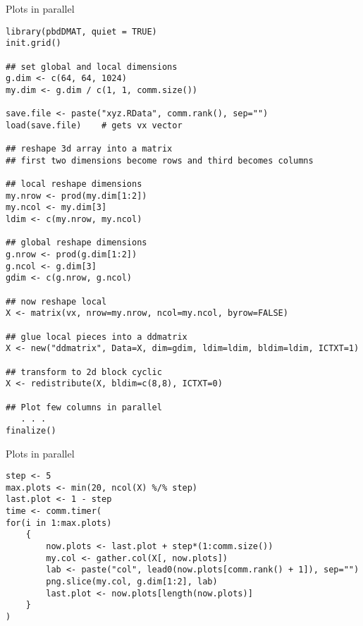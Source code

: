\begin{frame}
  \begin{exampleblock}{Plots in parallel}\pause
\begin{lstlisting}[title=Get and Redistribute the Data]
library(pbdDMAT, quiet = TRUE)
init.grid()

## set global and local dimensions
g.dim <- c(64, 64, 1024)
my.dim <- g.dim / c(1, 1, comm.size())

save.file <- paste("xyz.RData", comm.rank(), sep="")
load(save.file)    # gets vx vector

## reshape 3d array into a matrix
## first two dimensions become rows and third becomes columns

## local reshape dimensions
my.nrow <- prod(my.dim[1:2])
my.ncol <- my.dim[3]
ldim <- c(my.nrow, my.ncol)

## global reshape dimensions
g.nrow <- prod(g.dim[1:2])
g.ncol <- g.dim[3]
gdim <- c(g.nrow, g.ncol)

## now reshape local
X <- matrix(vx, nrow=my.nrow, ncol=my.ncol, byrow=FALSE)

## glue local pieces into a ddmatrix
X <- new("ddmatrix", Data=X, dim=gdim, ldim=ldim, bldim=ldim, ICTXT=1)

## transform to 2d block cyclic
X <- redistribute(X, bldim=c(8,8), ICTXT=0)

## Plot few columns in parallel
   . . .
finalize()
\end{lstlisting}
  \end{exampleblock}
\end{frame}

\begin{frame}
  \begin{exampleblock}{Plots in parallel}\pause
\begin{lstlisting}[title=Make plots in parallel comm.size() batches]
step <- 5
max.plots <- min(20, ncol(X) %/% step)
last.plot <- 1 - step
time <- comm.timer(
for(i in 1:max.plots)
    {
        now.plots <- last.plot + step*(1:comm.size())
        my.col <- gather.col(X[, now.plots])
        lab <- paste("col", lead0(now.plots[comm.rank() + 1]), sep="")
        png.slice(my.col, g.dim[1:2], lab)
        last.plot <- now.plots[length(now.plots)]
    }
)
\end{lstlisting}
  \end{exampleblock}
\end{frame}



